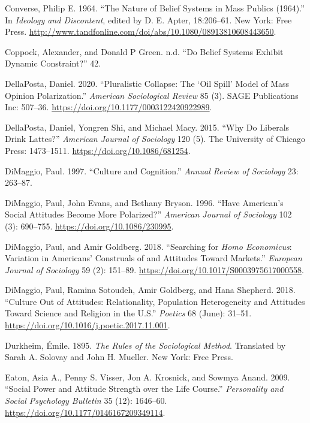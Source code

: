 \documentclass[12pt,]{article}
\begin{document}
\leavevmode\hypertarget{ref-converse1964}{}%
Converse, Philip E. 1964. ``The Nature of Belief Systems in Mass Publics (1964).'' In \emph{Ideology and Discontent}, edited by D. E. Apter, 18:206--61. New York: Free Press. \url{http://www.tandfonline.com/doi/abs/10.1080/08913810608443650}.

\leavevmode\hypertarget{ref-coppock}{}%
Coppock, Alexander, and Donald P Green. n.d. ``Do Belief Systems Exhibit Dynamic Constraint?'' 42.

\leavevmode\hypertarget{ref-dellaposta2020}{}%
DellaPosta, Daniel. 2020. ``Pluralistic Collapse: The `Oil Spill' Model of Mass Opinion Polarization.'' \emph{American Sociological Review} 85 (3). SAGE Publications Inc: 507--36. \url{https://doi.org/10.1177/0003122420922989}.

\leavevmode\hypertarget{ref-dellaposta2015}{}%
DellaPosta, Daniel, Yongren Shi, and Michael Macy. 2015. ``Why Do Liberals Drink Lattes?'' \emph{American Journal of Sociology} 120 (5). The University of Chicago Press: 1473--1511. \url{https://doi.org/10.1086/681254}.

\leavevmode\hypertarget{ref-dimaggio1997}{}%
DiMaggio, Paul. 1997. ``Culture and Cognition.'' \emph{Annual Review of Sociology} 23: 263--87.

\leavevmode\hypertarget{ref-dimaggio1996}{}%
DiMaggio, Paul, John Evans, and Bethany Bryson. 1996. ``Have American's Social Attitudes Become More Polarized?'' \emph{American Journal of Sociology} 102 (3): 690--755. \url{https://doi.org/10.1086/230995}.

\leavevmode\hypertarget{ref-dimaggio2018}{}%
DiMaggio, Paul, and Amir Goldberg. 2018. ``Searching for \emph{Homo Economicus}: Variation in Americans' Construals of and Attitudes Toward Markets.'' \emph{European Journal of Sociology} 59 (2): 151--89. \url{https://doi.org/10.1017/S0003975617000558}.

\leavevmode\hypertarget{ref-dimaggio2018a}{}%
DiMaggio, Paul, Ramina Sotoudeh, Amir Goldberg, and Hana Shepherd. 2018. ``Culture Out of Attitudes: Relationality, Population Heterogeneity and Attitudes Toward Science and Religion in the U.S.'' \emph{Poetics} 68 (June): 31--51. \url{https://doi.org/10.1016/j.poetic.2017.11.001}.

\leavevmode\hypertarget{ref-durkheim1895}{}%
Durkheim, Émile. 1895. \emph{The Rules of the Sociological Method}. Translated by Sarah A. Solovay and John H. Mueller. New York: Free Press.

\leavevmode\hypertarget{ref-eaton2009}{}%
Eaton, Asia A., Penny S. Visser, Jon A. Krosnick, and Sowmya Anand. 2009. ``Social Power and Attitude Strength over the Life Course.'' \emph{Personality and Social Psychology Bulletin} 35 (12): 1646--60. \url{https://doi.org/10.1177/0146167209349114}.
\end{document}
